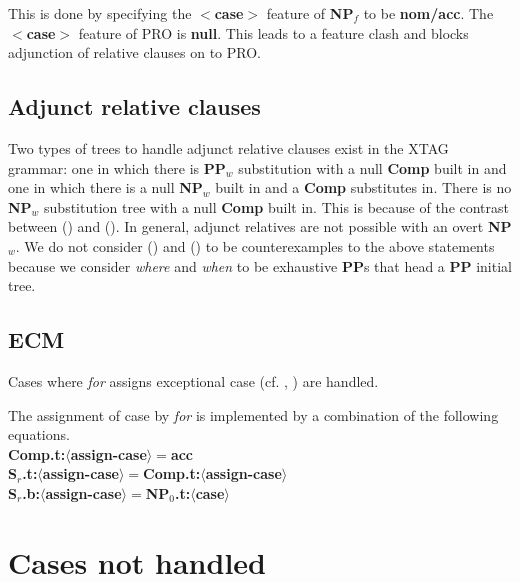 This is done by specifying the {\bf $<$case$>$} feature of {\bf NP$_{f}$} to be
{\bf nom/acc}. The {\bf $<$case$>$} feature of PRO is {\bf null}. This
leads to a feature clash and blocks adjunction of relative clauses on to
PRO.

\subsection{Adjunct relative clauses}
Two types of trees to handle adjunct relative clauses exist in the 
XTAG grammar: one in which there is {\bf PP$_{w}$} substitution with 
a null {\bf Comp} built in and one in which there is a null {\bf NP$_{w}$}
built in and a {\bf Comp} substitutes in. There is no {\bf NP$_{w}$}
substitution tree with a null {\bf Comp} built in. This is because of
the contrast between () and ().
In general, adjunct relatives are not possible with an overt {\bf NP$_{w}$}. 
We do not consider () and () to be counterexamples to 
the above statements because we consider {\em where} and {\em when}
to be exhaustive {\bf PP}s that head a {\bf PP} initial tree.


\subsection{ECM}
Cases where {\em for} assigns exceptional case (cf. , ) are handled.


The assignment of case by {\em for} is implemented by a combination of the
following equations.\\
{\bf Comp.t:$\langle$assign-case$\rangle =$acc}\\
{\bf S$_{r}$.t:$\langle$assign-case$\rangle =$Comp.t:$\langle$assign-case$\rangle$}\\
{\bf S$_{r}$.b:$\langle$assign-case$\rangle =$NP$_{0}$.t:$\langle$case$\rangle$}

\section{Cases not handled}
